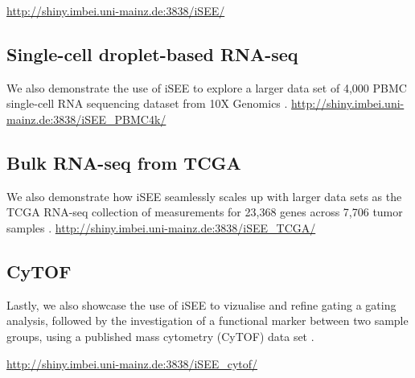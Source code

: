 \documentclass[10pt,a4paper,twocolumn]{article}
\begin{document}
\url{http://shiny.imbei.uni-mainz.de:3838/iSEE/}

\subsection*{Single-cell droplet-based RNA-seq}
We also demonstrate the use of iSEE to explore a larger data set of 4,000 PBMC single-cell RNA sequencing dataset from 10X Genomics \citep{zheng2017massively}.
\url{http://shiny.imbei.uni-mainz.de:3838/iSEE_PBMC4k/}

\subsection*{Bulk RNA-seq from TCGA}
We also demonstrate how iSEE seamlessly scales up with larger data sets as the TCGA RNA-seq collection of measurements for 23,368 genes across 7,706 tumor samples \citep{piccolo2015TCGA}.
\url{http://shiny.imbei.uni-mainz.de:3838/iSEE_TCGA/}

\subsection*{CyTOF}
Lastly, we also showcase the use of iSEE to vizualise and refine gating a gating analysis, followed by the investigation of a functional marker between two sample groups, using a published mass cytometry (CyTOF) data set \citep{bodenmiller2012cytof}.

\url{http://shiny.imbei.uni-mainz.de:3838/iSEE_cytof/}
\end{document}
